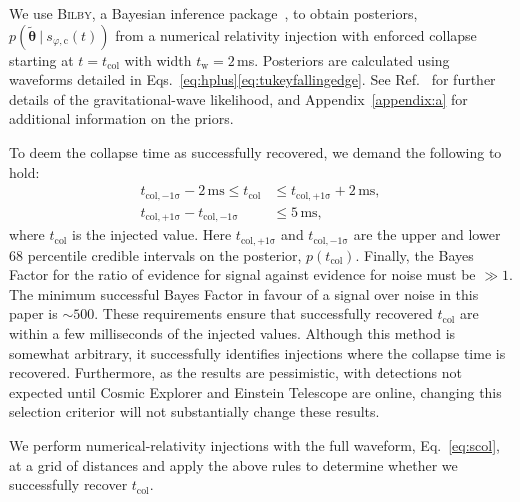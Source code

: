 \documentclass[
reprint,
prd,
twocolumn,
nofootinbib,
 amsmath,
showpacs ,amssymb, aps,%
superscriptaddress
]{revtex4-1}
\newcommand{\tc}{t_{\mathrm{col}}}
\newcommand{\tcu}{t_{\mathrm{col,+1\sigma}}}
\newcommand{\tcl}{t_{\mathrm{col,-1\sigma}}}
\newcommand{\tw}{t_{\mathrm{w}}}
\begin{document}
    We use \textsc{Bilby}, a Bayesian inference package~\cite{Ashton2019}, to obtain posteriors, $p(\boldsymbol{\tilde{\theta}}~|~s_{\varphi,\mathrm{c}}(t))$ from a numerical relativity injection with enforced collapse starting at $t=\tc$ with width $\tw=2$\,ms.
    Posteriors are calculated using waveforms detailed in Eqs.~\ref{eq:hplus}\Hyphdash*\ref{eq:tukeyfallingedge}. 
    See Ref.~\cite{Easter2020} for further details of the gravitational-wave likelihood, and Appendix~\ref{appendix:a} for additional information on the priors.
    \par
    To deem the collapse time as successfully recovered, we demand the following to hold: 
\begin{align}
    \tcl - 2\,\mathrm{ms} \leqslant \tc & \leqslant  \tcu + 2\,\mathrm{ms},\\
    \tcu - \tcl & \leqslant  5\,\mathrm{ms},
\end{align}
    where $\tc$ is the injected value. 
    Here $\tcu$ and $\tcl$ are the upper and lower 68 percentile credible intervals on the posterior,  $p(\tc)$.
    Finally, the Bayes Factor for the ratio of evidence for signal against evidence for noise must be $\gg 1$.
    The minimum successful Bayes Factor in favour of a signal over noise in this paper is $\sim\!500$.
    These requirements ensure that successfully recovered $\tc$ are within a few milliseconds of the  injected values. 
    Although this method is somewhat arbitrary, it successfully identifies injections where the collapse time is recovered.
    Furthermore, as the results are pessimistic, with detections not expected until Cosmic Explorer and Einstein Telescope are online, changing this selection criterior will not substantially change these results. \par

    
    We perform numerical-relativity injections with the full waveform, Eq.~\ref{eq:scol}, at a grid of distances and apply the above rules to determine whether we successfully recover $\tc$.

\vspace{-0.25cm}    
\end{document}
